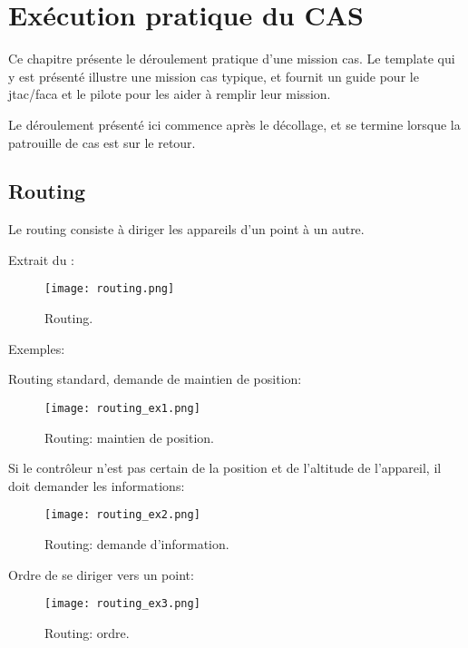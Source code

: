 \chapter{Exécution pratique du CAS}

\e
    \item
    Ce chapitre présente le déroulement pratique d’une mission \acrshort{cas}. Le template qui y est présenté illustre une mission \acrshort{cas} typique, et fournit un guide pour le \acrshort{jtac}/\acrshort{faca} et le pilote pour les aider à remplir leur mission.
    \item Le déroulement présenté ici commence après le décollage, et se termine lorsque la patrouille de \acrshort{cas} est sur le retour.
\ed

\section{Routing}
\e
    \item Le routing consiste à diriger les appareils d’un point à un autre.
    \item Extrait du \jp:\\
    \begin{figure}[H]
        \texttt{[image: routing.png]}
        \caption{Routing.}
        \label{fig:routing}
    \end{figure}
    \item Exemples:\\
    \ee
        \item Routing standard, demande de maintien de position:\\
        \begin{figure}[H]
            \texttt{[image: routing\_ex1.png]}
            \caption{Routing: maintien de position.}
            \label{fig:routingpos}
        \end{figure}
        \item Si le contrôleur n'est pas certain de la position et de l'altitude de l'appareil, il doit demander les informations:\\
        \begin{figure}[H]
            \texttt{[image: routing\_ex2.png]}
            \caption{Routing: demande d'information.}
            \label{fig:routinginfo}
        \end{figure}
        \item Ordre de se diriger vers un point:\\
        \begin{figure}[H]
            \texttt{[image: routing\_ex3.png]}
            \caption{Routing: ordre.}
            \label{fig:routingorder}
        \end{figure}
